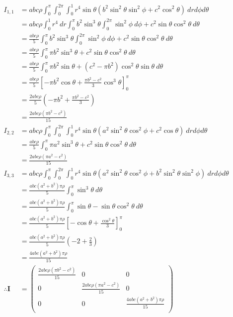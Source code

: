 \documentclass[12pt]{article}
\begin{document}
\begin{align*}
	I_{1,1} &= 
	abc \rho \int_0^\pi \int_0^{2\pi} \int_0^1 
		r^4 \sin\theta (
			b^2\sin^2\theta\sin^2\phi + c^2\cos^2\theta
		)
	\ dr d\phi d\theta \\
	&= abc \rho 
	\int_0^1 
		r^4
	\ dr 
	\int_0^\pi 
		b^2 \sin^3\theta 
			\int_0^{2\pi} 
				\sin^2\phi 
			\ d\phi 
		+ c^2 \sin\theta \cos^2\theta
	\ d\theta \\
	&= \frac{abc \rho}{5}
	\int_0^\pi 
		b^2 \sin^3\theta 
			\int_0^{2\pi} 
				\sin^2\phi 
			\ d\phi 
		+ c^2 \sin\theta \cos^2\theta
	\ d\theta \\
	&= \frac{abc \rho}{5}
	\int_0^\pi 
		\pi b^2 \sin^3\theta 
		+ c^2 \sin\theta \cos^2\theta
	\ d\theta \\
	&= \frac{abc \rho}{5}
	\int_0^\pi 
		\pi b^2 \sin\theta + (c^2 -\pi b^2)\cos^2\theta\sin\theta
	\ d\theta \\
	&= \frac{abc \rho}{5} [
		-\pi b^2 \cos\theta + \frac{\pi b^2 - c^2}{3}\cos^3\theta
	]_0^\pi \\
	&= \frac{2abc \rho}{5} \left(	
		-\pi b^2 + \frac{\pi b^2 - c^2}{3}
	\right) \\
	&= \frac{2abc \rho(\pi b^2 - c^2)}{15} \\
	I_{2,2} &= 
	abc \rho \int_0^\pi \int_0^{2\pi} \int_0^1 
		r^4 \sin\theta (
			a^2\sin^2\theta\cos^2\phi + c^2\cos\theta
		)
	\ dr d\phi d\theta \\
	&= \frac{abc \rho}{5}
	\int_0^\pi 
		\pi a^2 \sin^3\theta 
		+ c^2 \sin\theta \cos^2\theta
	\ d\theta \\
	&= \frac{2abc \rho(\pi a^2 - c^2)}{15} \\
	I_{3,3} &= 
	abc \rho \int_0^\pi \int_0^{2\pi} \int_0^1 
		r^4 \sin\theta (
			a^2\sin^2\theta\cos^2\phi + b^2\sin^2\theta\sin^2\phi
		)
	\ dr d\phi d\theta \\
	&= \frac{abc (a^2 + b^2) \pi\rho}{5}
	\int_0^\pi 
		\sin^3\theta
	\ d\theta \\
	&= \frac{abc (a^2 + b^2) \pi\rho}{5}
	\int_0^\pi 
		\sin\theta - \sin\theta\cos^2\theta
	\ d\theta \\
	&= \frac{abc (a^2 + b^2) \pi\rho}{5} \left[
		-\cos\theta + \frac{\cos^2\theta}{3}
	\right]_0^\pi \\
	&= \frac{abc (a^2 + b^2) \pi\rho}{5} \left(-2 + \frac{2}{3} \right) \\
	&= \frac{4abc (a^2 + b^2) \pi\rho}{15} \\
	\therefore \boldsymbol{I} &= \left( \begin{array}{ccc}
		\frac{2abc \rho(\pi b^2 - c^2)}{15} & 0 & 0 \\
		0 & \frac{2abc \rho(\pi a^2 - c^2)}{15} & 0 \\
		0 & 0 & \frac{4abc (a^2 + b^2) \pi\rho}{15} \\
	\end{array} \right)
\end{align*}
\end{document}

